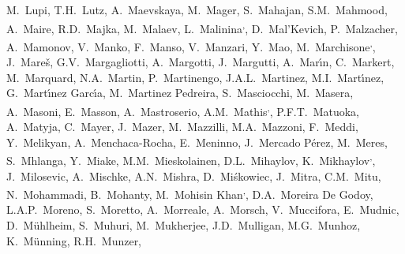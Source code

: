 \begin{flushleft}
M.~Lupi\And, 
T.H.~Lutz\And, 
A.~Maevskaya\And, 
M.~Mager\And, 
S.~Mahajan\And, 
S.M.~Mahmood\And, 
A.~Maire\And, 
R.D.~Majka\And, 
M.~Malaev\And, 
L.~Malinina\textsuperscript{,}\And, 
D.~Mal'Kevich\And, 
P.~Malzacher\And, 
A.~Mamonov\And, 
V.~Manko\And, 
F.~Manso\And, 
V.~Manzari\And, 
Y.~Mao\And, 
M.~Marchisone\textsuperscript{,}\And, 
J.~Mare\v{s}\And, 
G.V.~Margagliotti\And, 
A.~Margotti\And, 
J.~Margutti\And, 
A.~Mar\'{\i}n\And, 
C.~Markert\And, 
M.~Marquard\And, 
N.A.~Martin\And, 
P.~Martinengo\And, 
J.A.L.~Martinez\And, 
M.I.~Mart\'{\i}nez\And, 
G.~Mart\'{\i}nez Garc\'{\i}a\And, 
M.~Martinez Pedreira\And, 
S.~Masciocchi\And, 
M.~Masera\And, 
A.~Masoni\And, 
E.~Masson\And, 
A.~Mastroserio\And, 
A.M.~Mathis\textsuperscript{,}\And, 
P.F.T.~Matuoka\And, 
A.~Matyja\And, 
C.~Mayer\And, 
J.~Mazer\And, 
M.~Mazzilli\And, 
M.A.~Mazzoni\And, 
F.~Meddi\And, 
Y.~Melikyan\And, 
A.~Menchaca-Rocha\And, 
E.~Meninno\And, 
J.~Mercado P\'erez\And, 
M.~Meres\And, 
S.~Mhlanga\And, 
Y.~Miake\And, 
M.M.~Mieskolainen\And, 
D.L.~Mihaylov\And, 
K.~Mikhaylov\textsuperscript{,}\And, 
J.~Milosevic\And, 
A.~Mischke\And, 
A.N.~Mishra\And, 
D.~Mi\'{s}kowiec\And, 
J.~Mitra\And, 
C.M.~Mitu\And, 
N.~Mohammadi\And, 
B.~Mohanty\And, 
M.~Mohisin Khan\textsuperscript{,}\And, 
D.A.~Moreira De Godoy\And, 
L.A.P.~Moreno\And, 
S.~Moretto\And, 
A.~Morreale\And, 
A.~Morsch\And, 
V.~Muccifora\And, 
E.~Mudnic\And, 
D.~M{\"u}hlheim\And, 
S.~Muhuri\And, 
M.~Mukherjee\And, 
J.D.~Mulligan\And, 
M.G.~Munhoz\And, 
K.~M\"{u}nning\And, 
R.H.~Munzer\And, 

\end{flushleft}
